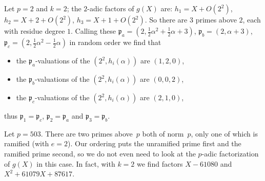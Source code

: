 \documentclass{article}
\def\p{{\mathfrak p}}
\begin{document}
Let $p=2$ and $k=2$; the $2$-adic factors of $g(X)$ are: $h_1=X+O(2^2)$,
$h_2=X+2+O(2^2)$, $h_3=X+1+O(2^2)$.  So there are $3$
primes above $2$, each with residue degree $1$.
Calling these $\p_a = (2,\frac 12\alpha^2+\frac 12\alpha+3)$, $\p_b =
(2,\alpha+3)$, $\p_c = (2,\frac 12\alpha^2-\frac 12\alpha)$ in random order we find that
\begin{itemize}
  \item the $\p_a$-valuations of the $(2^2,h_i(\alpha))$ are $(1,2,0)$,
  \item the $\p_b$-valuations of the $(2^2,h_i(\alpha))$ are $(0,0,2)$,
  \item the $\p_c$-valuations of the $(2^2,h_i(\alpha))$ are $(2,1,0)$,
\end{itemize}
thus $\p_1=\p_c$, $\p_2=\p_a$ and $\p_3=\p_b$.

Let $p=503$.  There are two primes above~$p$ both of norm~$p$, only
one of which is ramified (with $e=2$). Our ordering puts the
unramified prime first and the ramified prime second, so we do not even need to
look at the $p$-adic factorization of $g(X)$ in this case.  In fact,
with $k=2$ we find factors $X-61080$ and $X^2+61079X+87617$.
\end{document}
